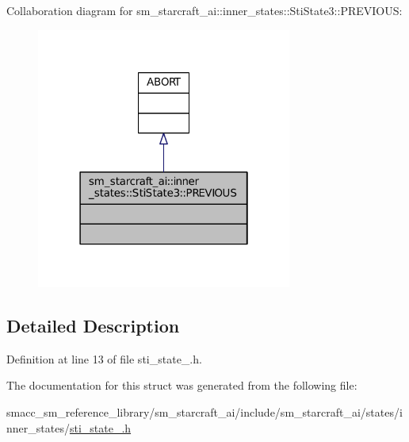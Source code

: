 Collaboration diagram for sm\+\_\+starcraft\+\_\+ai\+:\+:inner\+\_\+states\+:\+:Sti\+State3\+:\+:P\+R\+E\+V\+I\+O\+US\+:
\nopagebreak
\begin{figure}[H]
\begin{center}
\leavevmode
\includegraphics[width=238pt]{structsm__starcraft__ai_1_1inner__states_1_1StiState3_1_1PREVIOUS__coll__graph}
\end{center}
\end{figure}


\subsection{Detailed Description}


Definition at line 13 of file sti\+\_\+state\+\_.\+h.



The documentation for this struct was generated from the following file\+:\begin{DoxyCompactItemize}
\item 
smacc\+\_\+sm\+\_\+reference\+\_\+library/sm\+\_\+starcraft\+\_\+ai/include/sm\+\_\+starcraft\+\_\+ai/states/inner\+\_\+states/\hyperlink{sm__starcraft__ai_2include_2sm__starcraft__ai_2states_2inner__states_2sti__state__3_8h}{sti\+\_\+state\+\_.\+h}\end{DoxyCompactItemize}
